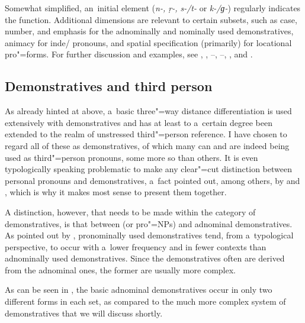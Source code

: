 Somewhat simplified, an~initial element (\textit{n-, ṛ-, s-/t-} or \textit{k-/ɡ-}) regularly indicates the  function. Additional dimensions are relevant to certain subsets, such as case, number,  and emphasis for the adnominally and nominally used demonstratives, animacy for inde/ pronouns, and spatial specification (primarily) for locational pro"=forms. For further discussion and examples, see , , --, --, ,  and .

\subsection{Demonstratives and third person}
\label{subsec:5-2-2}


As already hinted at above, a~basic three"=way distance differentiation is used extensively with demonstratives and has at least to a~certain degree been extended to the realm of unstressed third"=person reference. I have chosen to regard all of these as demonstratives, of which many can and are indeed being used as third"=person pronouns, some more so than others. It is even typologically speaking problematic to make any clear"=cut distinction between personal pronouns and demonstratives, a~fact pointed out, among others, by \citet[206]{himmelmann1996} and \citet[123--124]{kibrik2011}, which is why it makes most sense to present them together.



A distinction, however, that needs to be made within the category of demonstratives, is that between  (or pro"=NPs) and adnominal demonstratives. As pointed out by \citet[206]{himmelmann1996}, pronominally used demonstratives tend, from a~typological perspective, to occur with a~lower frequency and in fewer contexts than adnominally used demonstratives. Since the  demonstratives often are derived from the adnominal ones, the former are usually more complex. 



As can be seen in , the basic adnominal demonstratives occur in only two different forms in each  set, as compared to the much more complex system of  demonstratives that we will discuss shortly. 



